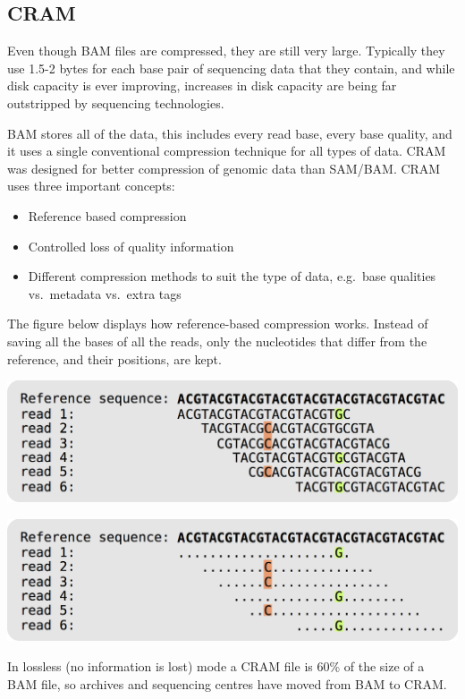 \documentclass[11pt]{article}
\providecommand{\tightlist}{%
      \setlength{\itemsep}{0pt}\setlength{\parskip}{0pt}}
\begin{document}
    \hypertarget{cram}{%
\subsection{CRAM}\label{cram}}

Even though BAM files are compressed, they are still very large.
Typically they use 1.5-2 bytes for each base pair of sequencing data
that they contain, and while disk capacity is ever improving, increases
in disk capacity are being far outstripped by sequencing technologies.

    BAM stores all of the data, this includes every read base, every base
quality, and it uses a single conventional compression technique for all
types of data. CRAM was designed for better compression of genomic data
than SAM/BAM. CRAM uses three important concepts:

\begin{itemize}
\tightlist
\item
  Reference based compression
\item
  Controlled loss of quality information
\item
  Different compression methods to suit the type of data, e.g.~base
  qualities vs.~metadata vs.~extra tags
\end{itemize}

The figure below displays how reference-based compression works. Instead
of saving all the bases of all the reads, only the nucleotides that
differ from the reference, and their positions, are kept.

    \includegraphics{img/CRAM_format.png}

    \includegraphics{img/CRAM_format2.png}

    In lossless (no information is lost) mode a CRAM file is 60\% of the
size of a BAM file, so archives and sequencing centres have moved from
BAM to CRAM.
\end{document}
